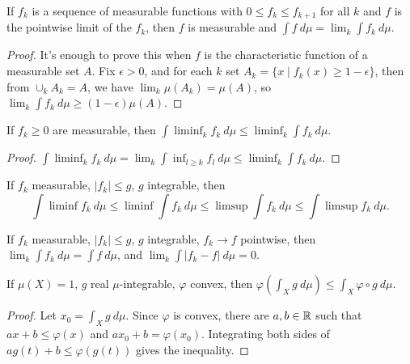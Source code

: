 \begin{thm}\label{monotone-convergence} If $f_k$ is a sequence of measurable functions with $0 \le f_k \le f_{k+1}$ for all $k$ and $f$ is the pointwise limit of the $f_k$, then $f$ is measurable and $\int f\ d\mu = \lim_k \int f_k\ d\mu$.
\end{thm}
\begin{proof} It's enough to prove this when $f$ is the characteristic function of a measurable set $A$. Fix $\epsilon > 0$, and for each $k$ set $A_k = \{x \mid f_k(x) \ge 1-\epsilon\}$, then from $\cup_k A_k = A$, we have $\lim_k \mu(A_k) = \mu(A)$, so $\lim_k \int f_k\ d\mu \ge (1-\epsilon)\mu(A)$.
\end{proof}

\begin{lem} If $f_k \ge 0$ are measurable, then $\int \liminf_k f_k\ d\mu \le \liminf_k \int f_k\ d\mu$.
\end{lem}
\begin{proof} $\int \liminf_k f_k\ d\mu = \lim_k \int \inf_{l\ge k} f_l\ d\mu \le \liminf_k \int f_k\ d\mu$.
\end{proof}

\begin{cor} If $f_k$ measurable, $|f_k| \le g$, $g$ integrable, then
\[
\int \liminf f_k\ d\mu \le \liminf \int f_k\ d\mu \le \limsup \int f_k\ d\mu \le \int \limsup f_k\ d\mu.
\]
\end{cor}

\begin{thm}\label{dominated-convergence} If $f_k$ measurable, $|f_k| \le g$, $g$ integrable, $f_k \rightarrow f$ pointwise, then $\lim_k \int f_k\ d\mu = \int f\ d\mu$, and $\lim_k \int |f_k - f|\ d\mu = 0$.
\end{thm}

\begin{thm}[Jensen]\label{jensen} If $\mu(X) = 1$, $g$ real $\mu$-integrable, $\varphi$ convex, then $\varphi(\int_X g\ d\mu) \le \int_X \varphi \circ g\ d\mu$.
\end{thm}
\begin{proof} Let $x_0 = \int_X g\ d\mu$. Since $\varphi$ is convex, there are $a,b \in \mathbb{R}$ such that $ax+b \le \varphi(x)$ and $ax_0+b = \varphi(x_0)$. Integrating both sides of $ag(t) + b \le \varphi(g(t))$ gives the inequality.
\end{proof}

